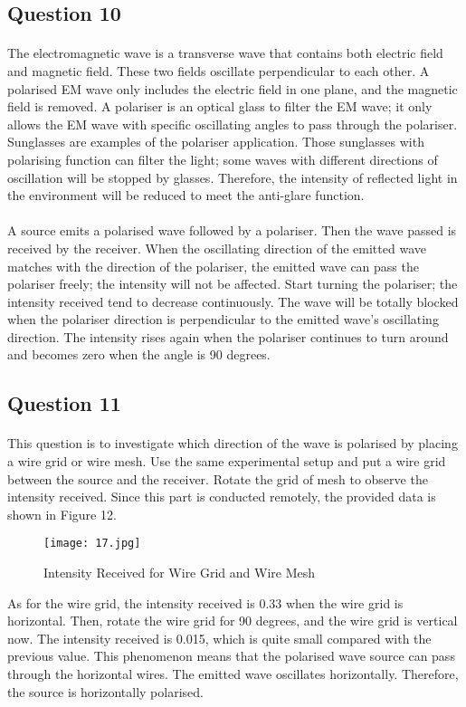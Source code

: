 \documentclass[12pt]{article}
\begin{document}
    \subsection{Question 10}
    \paragraph{}
    The electromagnetic wave is a transverse wave that contains both electric field and magnetic field. These two fields oscillate perpendicular to each other. A polarised EM wave only includes the electric field in one plane, and the magnetic field is removed. A polariser is an optical glass to filter the EM wave; it only allows the EM wave with specific oscillating angles to pass through the polariser. Sunglasses are examples of the polariser application. Those sunglasses with polarising function can filter the light; some waves with different directions of oscillation will be stopped by glasses. Therefore, the intensity of reflected light in the environment will be reduced to meet the anti-glare function.
    
    \paragraph{}
    A source emits a polarised wave followed by a polariser. Then the wave passed is received by the receiver. When the oscillating direction of the emitted wave matches with the direction of the polariser, the emitted wave can pass the polariser freely; the intensity will not be affected. Start turning the polariser; the intensity received tend to decrease continuously. The wave will be totally blocked when the polariser direction is perpendicular to the emitted wave's oscillating direction. The intensity rises again when the polariser continues to turn around and becomes zero when the angle is 90 degrees.
    

    \subsection{Question 11}
    \paragraph{}
    This question is to investigate which direction of the wave is polarised by placing a wire grid or wire mesh. Use the same experimental setup and put a wire grid between the source and the receiver. Rotate the grid of mesh to observe the intensity received. Since this part is conducted remotely, the provided data is shown in Figure 12.
    \begin{figure}[H]
    \centering
    \texttt{[image: 17.jpg]}
    \caption{Intensity Received for Wire Grid and Wire Mesh\cite{9}}
    \end{figure}
    As for the wire grid, the intensity received is 0.33 when the wire grid is horizontal. Then, rotate the wire grid for 90 degrees, and the wire grid is vertical now. The intensity received is 0.015, which is quite small compared with the previous value. This phenomenon means that the polarised wave source can pass through the horizontal wires. The emitted wave oscillates horizontally. Therefore, the source is horizontally polarised. 
\end{document}
